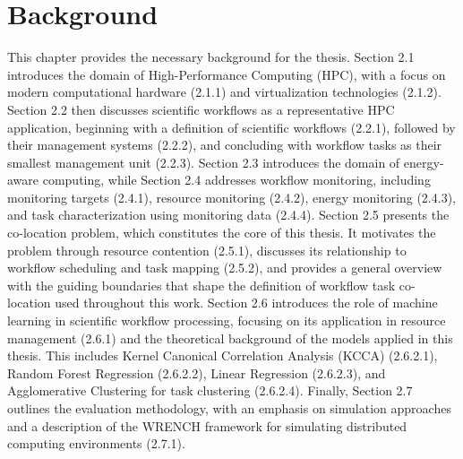 \section{Background}
\label{cha:background}

This chapter provides the necessary background for the thesis. Section 2.1 introduces the domain of High-Performance Computing (HPC), with a focus on modern computational hardware (2.1.1) and virtualization technologies (2.1.2). Section 2.2 then discusses scientific workflows as a representative HPC application, beginning with a definition of scientific workflows (2.2.1), followed by their management systems (2.2.2), and concluding with workflow tasks as their smallest management unit (2.2.3). Section 2.3 introduces the domain of energy-aware computing, while Section 2.4 addresses workflow monitoring, including monitoring targets (2.4.1), resource monitoring (2.4.2), energy monitoring (2.4.3), and task characterization using monitoring data (2.4.4). Section 2.5 presents the co-location problem, which constitutes the core of this thesis. It motivates the problem through resource contention (2.5.1), discusses its relationship to workflow scheduling and task mapping (2.5.2), and provides a general overview with the guiding boundaries that shape the definition of workflow task co-location used throughout this work. Section 2.6 introduces the role of machine learning in scientific workflow processing, focusing on its application in resource management (2.6.1) and the theoretical background of the models applied in this thesis. This includes Kernel Canonical Correlation Analysis (KCCA) (2.6.2.1), Random Forest Regression (2.6.2.2), Linear Regression (2.6.2.3), and Agglomerative Clustering for task clustering (2.6.2.4). Finally, Section 2.7 outlines the evaluation methodology, with an emphasis on simulation approaches and a description of the WRENCH framework for simulating distributed computing environments (2.7.1).


